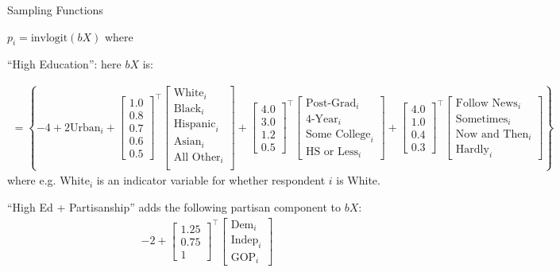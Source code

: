 \documentclass[ignorenonframetext, 10pt, aspectratio=169]{beamer}
\begin{document}
\begin{frame}
{Sampling Functions}

\(p_i = \text{invlogit}(bX)\) where 

\bigskip

``High Education'': here \(bX\) is:

\small
\begin{align*}
 = \left\{-4 + 2\text{Urban}_i + \begin{bmatrix}1.0\\0.8 \\0.7\\ 0.6\\ 0.5\end{bmatrix}^\top\begin{bmatrix}\text{White}_i\\\text{Black}_i\\\text{Hispanic}_i\\\text{Asian}_i\\\text{All Other}_i\\\end{bmatrix} + 
\begin{bmatrix}4.0\\3.0\\1.2\\0.5\end{bmatrix}^\top\begin{bmatrix}\text{Post-Grad}_i\\\text{4-Year}_i\\\text{Some College}_i\\\text{HS or Less}_i\end{bmatrix}  + 
\begin{bmatrix}4.0\\1.0\\ 0.4\\ 0.3\end{bmatrix}^\top\begin{bmatrix}\text{Follow News}_i\\\text{Sometimes}_i\\\text{Now and Then}_i\\\text{Hardly}_i\end{bmatrix}\right\}
\end{align*}
\normalsize
where e.g. White$_{i}$ is an indicator variable for whether respondent \(i\) is White. 

\bigskip


``High Ed + Partisanship'' adds the following partisan component to \(bX\):
\small
\begin{align*}
-2 + \begin{bmatrix}1.25\\0.75\\1\end{bmatrix}^\top\begin{bmatrix}\text{Dem}_{i}\\\text{Indep}_i\\\text{GOP}_i\end{bmatrix}
\end{align*}
\end{frame}
\end{document}
